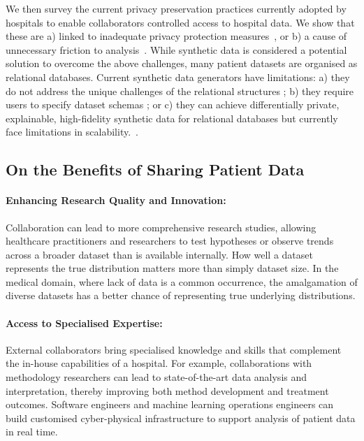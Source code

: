 \documentclass[11pt]{article}
\begin{document}
We then survey the current privacy preservation practices currently adopted by hospitals to enable collaborators controlled access to hospital data.  We show that these are  a) linked to inadequate privacy protection measures~\cite{near2021, tucker2020}, or b) a cause of unnecessary friction to analysis~\cite{ODonovan2023}. While synthetic data is considered a potential solution to overcome the above challenges, many patient datasets are organised as relational databases. Current synthetic data generators have limitations: a) they do not address the unique challenges of the relational structures \cite{Nowok2016}\cite{Synthea2020}; b) they require users to specify dataset schemas \cite{Synth2021}; or c) they can achieve differentially private, explainable, high-fidelity synthetic data for relational databases but currently face limitations in scalability.~\cite{Cai2023}.

\subsection{On the Benefits of Sharing Patient Data}

\paragraph{Enhancing Research Quality and Innovation:} 
Collaboration can lead to more comprehensive research studies, allowing healthcare practitioners and researchers to test hypotheses or observe trends across a broader dataset than is available internally. How well a dataset represents the true distribution matters more than simply dataset size\cite{app11020796}. In the medical domain, where lack of data is a common occurrence, the amalgamation of diverse datasets has a better chance of representing true underlying distributions. 

\paragraph{Access to Specialised Expertise:} 
External collaborators bring specialised knowledge and skills that complement the in-house capabilities of a hospital. For example, collaborations with methodology researchers can lead to state-of-the-art data analysis and interpretation, thereby improving both method development and treatment outcomes. Software engineers and machine learning operations engineers can build customised cyber-physical infrastructure to support analysis of patient data in real time\cite{harris2022}.
\end{document}
